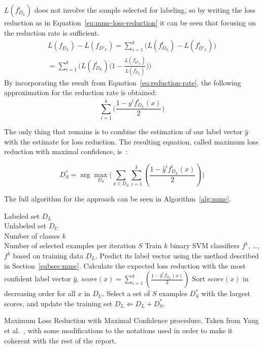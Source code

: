 $L(f^i_{D_L})$ does not involve the sample selected for labeling, so by writing the loss reduction as in Equation~\ref{eq:mmc-loss-reduction} it can be seen that focusing on the reduction rate is sufficient.
\begin{equation}\label{eq:mmc-loss-reduction}
    \begin{split}
        L(f_{D_L}) - L(f_{D'_L}) = \sum_{i=1}^k\big ( L(f^i_{D_L}) - L(f^i_{D'_L}) \big )\\
        = \sum_{i=1}^k\big ( L(f^i_{D_L}) \dot (1 - \frac{L(f^i_{D'_L})}{L(f^i_{D_L})}) \big )
    \end{split}
\end{equation}
By incorporating the result from Equation~\ref{eq:reduction-rate}, the following approximation for the reduction rate is obtained:
\begin{equation}
    \sum_{i=1}^k\big ( \frac{1 - y^if^i_{D_L}(x)}{2} \big )
\end{equation}

The only thing that remains is to combine the estimation of our label vector $\hat{y}$ with the estimate for loss reduction.
The resulting equation, called maximum loss reduction with maximal confidence, is~\cite{yang2009effective}:

\begin{equation}
    D^*_S = \arg \max_{D_S} \big ( \sum_{x \in D_S} \sum_{i=1}^k (\frac{1 - \hat{y}^if^i_{D_L}(x)}{2}) \big )
\end{equation}

The full algorithm for the approach can be seen in Algorithm~\ref{alg:mmc}.

\begin{algorithm}
    \begin{algorithmic}
        \REQUIRE Labeled set $D_L$\\
                 Unlabeled set $D_U$ \\
                 Number of classes $k$ \\
                 Number of selected examples per iteration $S$
        \REPEAT
            \STATE Train $k$ binary SVM classifiers $f^1$, \dots, $f^k$ based on training data $D_L$.
                \STATE Predict its label vector using the method described in Section~\ref{subsec:mmc}.
                \STATE Calculate the expected loss reduction with the most confident label vector $\hat{y}$, $score(x) = \sum_{i=1}^k (\frac{1 - \hat{y}^if^i_{D_L}(x)}{2})$
            \ENDFOR
            \STATE Sort $score(x)$ in decreasing order for all $x$ in $D_U$.
            \STATE Select a set of $S$ examples $D_S^*$ with the largest scores, and update the training set $D_L \Leftarrow D_L + D^*_S$.
    \end{algorithmic}

    \caption{Maximum Loss Reduction with Maximal Confidence procedure. Taken from Yang et al\@.~\cite{yang2009effective}, with some modifications to the notations used in order to make it coherent with the rest of the report.}
    \label{alg:mmc}
\end{algorithm}


